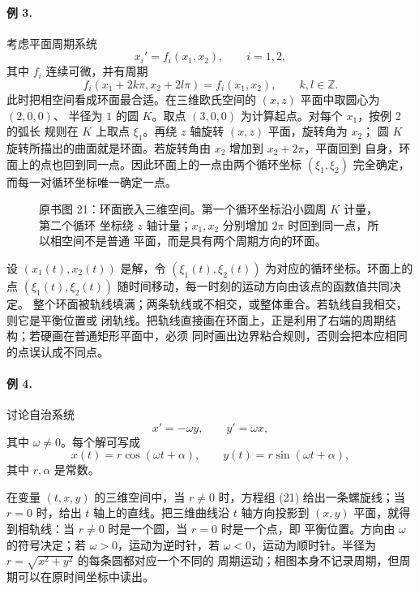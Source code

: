 \paragraph{例 3.}
考虑平面周期系统
\begin{equation}
 x_i'=f_i(x_1,x_2),\qquad i=1,2,
 \tag{20}
\end{equation}
其中 \(f_i\) 连续可微，并有周期
\[
 f_i(x_1+2k\pi,x_2+2l\pi)=f_i(x_1,x_2),\qquad k,l\in\mathbb Z.
\]
此时把相空间看成环面最合适。在三维欧氏空间的 \((x,z)\) 平面中取圆心为 \((2,0,0)\)、
半径为 \(1\) 的圆 \(K\)。取点 \((3,0,0)\) 为计算起点。对每个 \(x_1\)，按例 2 的弧长
规则在 \(K\) 上取点 \(\xi_1\)。再绕 \(z\) 轴旋转 \((x,z)\) 平面，旋转角为 \(x_2\)；
圆 \(K\) 旋转所描出的曲面就是环面。若旋转角由 \(x_2\) 增加到 \(x_2+2\pi\)，平面回到
自身，环面上的点也回到同一点。因此环面上的一点由两个循环坐标 \((\xi_1,\xi_2)\)
完全确定，而每一对循环坐标唯一确定一点。

\begin{figure}[H]
 \centering
 
 \caption{原书图 21：环面嵌入三维空间。第一个循环坐标沿小圆周 \(K\) 计量，第二个循环
 坐标绕 \(z\) 轴计量；\(x_1,x_2\) 分别增加 \(2\pi\) 时回到同一点，所以相空间不是普通
 平面，而是具有两个周期方向的环面。}
 \label{fig:ch2-p2-21}
\end{figure}

设 \((x_1(t),x_2(t))\) 是解，令 \((\xi_1(t),\xi_2(t))\) 为对应的循环坐标。环面上的
点 \((\xi_1(t),\xi_2(t))\) 随时间移动，每一时刻的运动方向由该点的函数值共同决定。
整个环面被轨线填满；两条轨线或不相交，或整体重合。若轨线自我相交，则它是平衡位置或
闭轨线。把轨线直接画在环面上，正是利用了右端的周期结构；若硬画在普通矩形平面中，必须
同时画出边界粘合规则，否则会把本应相同的点误认成不同点。

\paragraph{例 4.}
讨论自治系统
\[
 x'=-\omega y,\qquad y'=\omega x,
\]
其中 \(\omega\neq0\)。每个解可写成
\begin{equation}
 x(t)=r\cos(\omega t+\alpha),\qquad
 y(t)=r\sin(\omega t+\alpha),
 \tag{21}
\end{equation}
其中 \(r,\alpha\) 是常数。

在变量 \((t,x,y)\) 的三维空间中，当 \(r\neq0\) 时，方程组 (21)
给出一条螺旋线；当 \(r=0\) 时，给出 \(t\) 轴上的直线。把三维曲线沿 \(t\) 轴方向投影到
\((x,y)\) 平面，就得到相轨线：当 \(r\neq0\) 时是一个圆，当 \(r=0\) 时是一个点，即
平衡位置。方向由 \(\omega\) 的符号决定；若 \(\omega>0\)，运动为逆时针，若
\(\omega<0\)，运动为顺时针。半径为 \(r=\sqrt{x^2+y^2}\) 的每条圆都对应一个不同的
周期运动；相图本身不记录周期，但周期可以在原时间坐标中读出。

